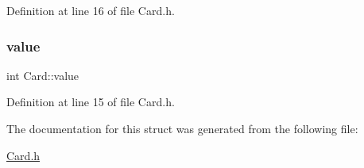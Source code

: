 Definition at line 16 of file Card.\+h.

\mbox{\label{struct_card_a57c4269cef032dac1f282c9b2be3be4d}} 
\subsubsection{\texorpdfstring{value}{value}}
{\footnotesize\ttfamily int Card\+::value}



Definition at line 15 of file Card.\+h.



The documentation for this struct was generated from the following file\+:\begin{DoxyCompactItemize}
\item 
\mbox{\hyperlink{_card_8h}{Card.\+h}}\end{DoxyCompactItemize}
